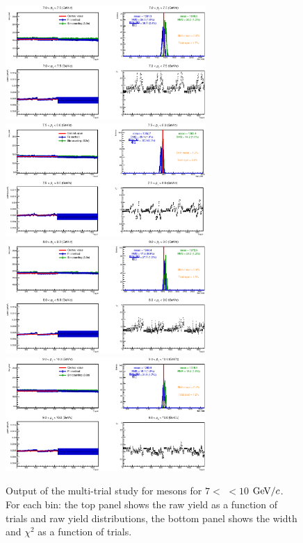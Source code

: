 \begin{figure}[!h]
\begin{center}
\includegraphics[width=0.68\textwidth]{figures/Dstar/pp13TeV/multi_trial/MultiFit_bkg5_7-7.eps}
\includegraphics[width=0.68\textwidth]{figures/Dstar/pp13TeV/multi_trial/MultiFit_bkg5_7-8.eps}
\includegraphics[width=0.68\textwidth]{figures/Dstar/pp13TeV/multi_trial/MultiFit_bkg5_8-9.eps}
\includegraphics[width=0.68\textwidth]{figures/Dstar/pp13TeV/multi_trial/MultiFit_bkg5_9-10.eps}
\caption{Output of the multi-trial study for \Dstar mesons for $7<$ \pt$<10$ ${\rm GeV}/c$. For each \pt bin: the top panel shows the raw yield as a function of trials and raw yield distributions, the bottom panel shows the width and $\chi^2$ as a function of trials.}
\label{fig:DstarYieldSyst010_3}
\end{center}
\end{figure}



